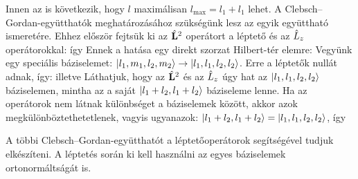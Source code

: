    Innen az is következik, hogy $l$ maximálisan $l_\text{max}=l_1+l_1$ lehet. A Clebsch--Gor\-dan-egy\-ütt\-ha\-tók meghatározásához szükségünk lesz az egyik együttható ismeretére. Ehhez először fejtsük ki az $\hat{\mathbf{L}}^2$ operátort a léptető és az $\hat{L}_z$ operátorokkal:
   így
   Ennek a hatása egy direkt szorzat Hilbert-tér elemre:
   Vegyünk egy speciális báziselemet: $\lvert l_1,m_1,l_2,m_2\rangle\to\lvert l_1,l_1,l_2,l_2\rangle$. Erre a léptetők nullát adnak, így:
   illetve
   Láthatjuk, hogy az $\hat{\mathbf{L}}^2$ és az $\hat{L}_z$ úgy hat az $\lvert l_1,l_1,l_2,l_2\rangle$ báziselemen, mintha az a saját $\lvert l_1+l_2,l_1+l_2\rangle$ báziseleme lenne. Ha az operátorok nem látnak különbséget a báziselemek között, akkor azok megkülönböztethetetlenek, vagyis ugyanazok: $\lvert l_1+l_2,l_1+l_2\rangle=\lvert l_1,l_1,l_2,l_2\rangle$, így
   
   A többi Clebsch--Gordan-együtthatót a léptetőoperátorok segítségével tudjuk elkészíteni. A léptetés során ki kell használni az egyes báziselemek ortonormáltságát is. 
   
